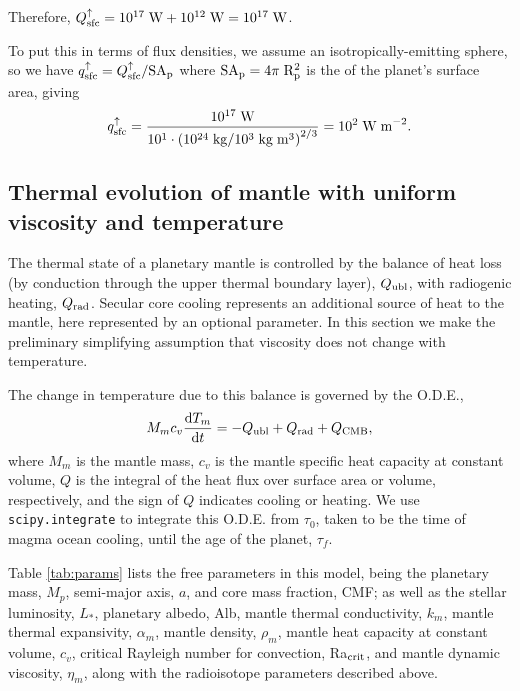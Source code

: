 \documentclass[10pt,a4paper]{article}
\begin{document}
Therefore, $Q_{\rm sfc}^{\uparrow} = 10^{17} \; {\rm W} + 10^{12} \; {\rm W} = 10^{17} \; {\rm W}$.

To put this in terms of flux densities, we assume an isotropically-emitting sphere, so we have $q_{\rm sfc}^{\uparrow} = Q_{\rm sfc}^{\uparrow}/\rm{SA}_p$ where $\rm{SA}_p = 4\pi\;R_p^2$ is the of the planet's surface area, giving
\begin{equation}
q_{\rm sfc}^{\uparrow} = \frac{10^{17} \; {\rm W}}{10^1 \cdot \left(10^{24}\;{\rm kg}/10^3 \; {\rm kg}\;{\rm m}^3\right)^{2/3}} = 10^2 \; \rm{W\;m}^{-2}.
\end{equation}

\subsection{Thermal evolution of mantle with uniform viscosity and temperature}

The thermal state of a planetary mantle is controlled by the balance of heat loss (by conduction through the upper thermal boundary layer), $Q_{\rm ubl}$, with radiogenic heating, $Q_{\rm rad}$. Secular core cooling represents an additional source of heat to the mantle, here represented by an optional parameter. In this section we make the preliminary simplifying assumption that viscosity does not change with temperature.

The change in temperature due to this balance is governed by the O.D.E.,
\begin{equation}
M_m c_v \frac{{\rm d}T_m}{{\rm d}t} = -Q_{\rm ubl} + Q_{\rm rad} + Q_{\rm CMB},
\end{equation}
where $M_m$ is the mantle mass, $c_v$ is the mantle specific heat capacity at constant volume, $Q$ is the integral of the heat flux over surface area or volume, respectively, and the sign of $Q$ indicates cooling or heating. We use {\tt scipy.integrate} to integrate this O.D.E. from $\tau_0$, taken to be the time of magma ocean cooling, until the age of the planet, $\tau_f$.  

\begin{table}
\label{tab:params}
\end{table}

Table \ref{tab:params} lists the free parameters in this model, being the planetary mass, $M_p$, semi-major axis, $a$, and core mass fraction, CMF; as well as the stellar luminosity, $L_*$, planetary albedo, Alb, mantle thermal conductivity, $k_m$, mantle thermal expansivity, $\alpha_m$, mantle density, $\rho_m$, mantle heat capacity at constant volume, $c_v$, critical Rayleigh number for convection, Ra$_{\rm crit}$, and mantle dynamic viscosity, $\eta_m$, along with the radioisotope parameters described above.
\end{document}
